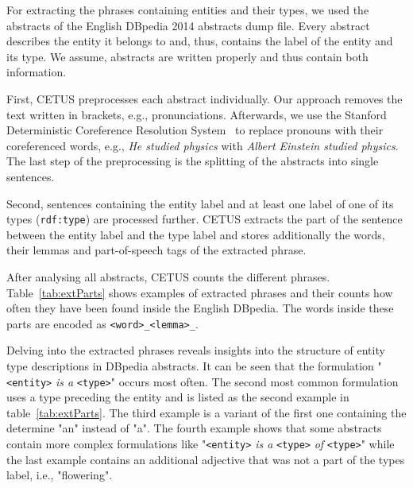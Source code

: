 For extracting the phrases containing entities and their types, we used the abstracts of the English DBpedia 2014 abstracts dump file.
Every abstract describes the entity it belongs to and, thus, contains the label of the entity and its type.
We assume, abstracts are written properly and thus contain both information.

First, CETUS preprocesses each abstract individually.
Our approach removes the text written in brackets, e.g., pronunciations.
Afterwards, we use the Stanford Deterministic Coreference Resolution System~\cite{Lee2013} to replace pronouns with their coreferenced words, e.g., \emph{He studied physics} with \emph{Albert Einstein studied physics}.
The last step of the preprocessing is the splitting of the abstracts into single sentences.

Second, sentences containing the entity label and at least one label of one of its types (\texttt{rdf:type}) are processed further.
CETUS extracts the part of the sentence between the entity label and the type label and stores additionally the words, their lemmas and part-of-speech tags of the extracted phrase.

After analysing all abstracts, CETUS counts the different phrases.
Table~\ref{tab:extParts} shows examples of extracted phrases and their counts how often they have been found inside the English DBpedia.
The words inside these parts are encoded as \texttt{<word>\_<lemma>\_<pos-tag>}.

Delving into the extracted phrases reveals insights into the structure of entity type descriptions in DBpedia abstracts.
It can be seen that the formulation "\texttt{<entity>} \emph{is a} \texttt{<type>}" occurs most often.
The second most common formulation uses a type preceding the entity and is listed as the second example in table~\ref{tab:extParts}.
The third example is a variant of the first one containing the determine "an" instead of "a".
The fourth example shows that some abstracts contain more complex formulations like "\texttt{<entity>} \emph{is a} \texttt{<type>} \emph{of} \texttt{<type>}" while the last example contains an additional adjective that was not a part of the types label, i.e., "flowering".

